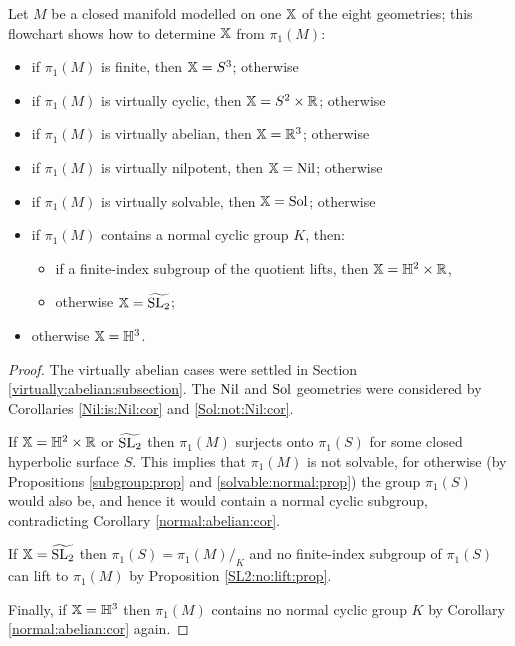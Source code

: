 \begin{prop}
Let $M$ be a closed manifold modelled on one $\mathbb{X}$ of the eight geometries; this flowchart shows how to determine $\mathbb{X}$ from $\pi_1(M)$:
\begin{itemize}
\item if $\pi_1(M)$ is finite, then $\mathbb{X} = S^3$; otherwise
\item if $\pi_1(M)$ is virtually cyclic, then $\mathbb{X} = S^2\times \mathbb{R}$; otherwise
\item if $\pi_1(M)$ is virtually abelian, then $\mathbb{X} = \mathbb{R}^3$; otherwise
\item if $\pi_1(M)$ is virtually nilpotent, then $\mathbb{X} = {\rm Nil}$; otherwise
\item if $\pi_1(M)$ is virtually solvable, then $\mathbb{X} = {\rm Sol}$; otherwise
\item if $\pi_1(M)$ contains a normal cyclic group $K$, then:
\begin{itemize}
\item if a finite-index subgroup of the quotient lifts, then $\mathbb{X} = \mathbb{H}^2 \times \mathbb{R}$, 
\item otherwise $\mathbb{X} = \widetilde{{\rm SL}_2}$; 
\end{itemize}
\item otherwise $\mathbb{X} = \mathbb{H}^3$.
\end{itemize}
\end{prop}
\begin{proof}
The virtually abelian cases were settled in Section \ref{virtually:abelian:subsection}. The ${\rm Nil}$ and ${\rm Sol}$ geometries were considered by Corollaries \ref{Nil:is:Nil:cor} and \ref{Sol:not:Nil:cor}. 

If $\mathbb{X} = \mathbb{H}^2\times \mathbb{R}$ or $\widetilde{{\rm SL}_2}$ then 
$\pi_1(M)$ surjects onto $\pi_1(S)$ for some closed hyperbolic surface $S$. 
This implies that $\pi_1(M)$ is not solvable, for otherwise
(by Propositions \ref{subgroup:prop} and \ref{solvable:normal:prop})
the group $\pi_1(S)$ would also be, and hence it would contain a normal cyclic subgroup, contradicting Corollary \ref{normal:abelian:cor}.

If $\mathbb{X} = \widetilde{{\rm SL}_2}$ then $\pi_1(S) = \pi_1(M)/_K$ and no finite-index subgroup of $\pi_1(S)$ can lift to $\pi_1(M)$ by Proposition \ref{SL2:no:lift:prop}.

Finally, if $\mathbb{X}=\mathbb{H}^3$ then $\pi_1(M)$ contains no normal cyclic group $K$ by Corollary \ref{normal:abelian:cor} again.
\end{proof}

